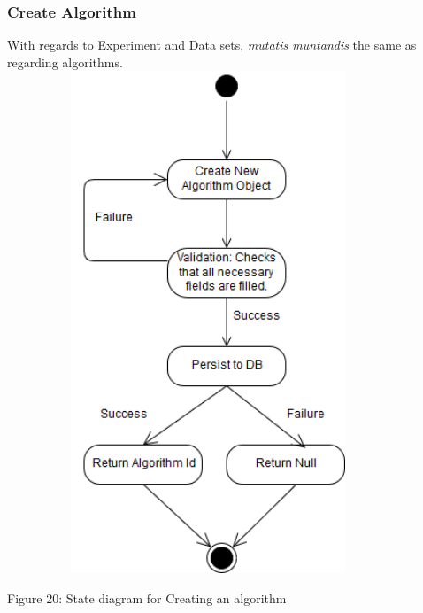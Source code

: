     	\subsubsection{Create Algorithm}
    \par With regards to Experiment and Data sets,
    {\textit{mutatis muntandis} the same as regarding algorithms.} \newline \newline
    \includegraphics[width=12cm,height=15cm,keepaspectratio]{input_unit/images/create_algorithm_state_diagram.png}
    \begin{center}
    	\small{Figure 20: State diagram for Creating an algorithm }
    \end{center}
    \newpage
